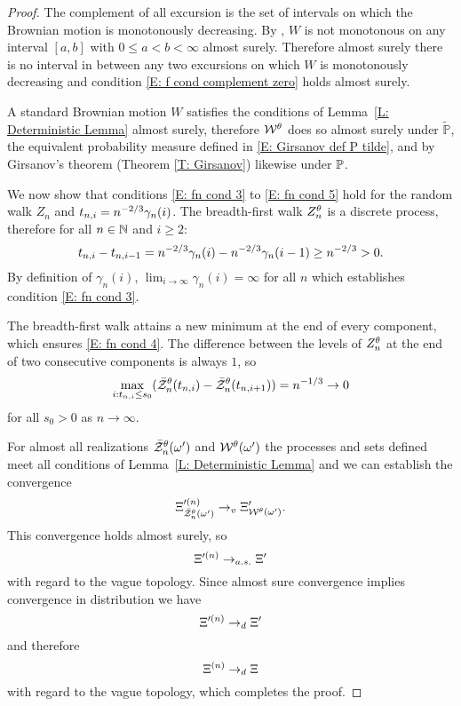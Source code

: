 \begin{proof}
	The complement of all excursion is the set of intervals
	on which the Brownian motion is monotonously decreasing.
	By \cite[Theorem 1.22, p.18]{Morters.2010}, 
	$W$ is not monotonous on any interval $[a,b]$ with $0 \leq a < b < \infty$ almost surely.
	Therefore almost surely there is no interval in between any two excursions on which $W$ is monotonously decreasing
	and condition \eqref{E: f cond complement zero} holds almost surely.
	
	A standard Brownian motion $W$ satisfies the conditions of Lemma~\ref{L: Deterministic Lemma} almost surely,
	therefore $\mathcal{W}^{\theta}$ does so almost surely under $\tilde{\mathbb{P}}$,
	the equivalent probability measure defined in \eqref{E: Girsanov def P tilde},
	and by Girsanov's theorem (Theorem \ref{T: Girsanov}) likewise under $\mathbb{P}$.

	
	We now show that conditions 
	\eqref{E: fn cond 3} to \eqref{E: fn cond 5}
	hold for the random walk $Z_n$ and $t_{n,i} = n^{-2 / 3} \gamma_n(i)$.
	The breadth-first walk $Z_n^{\theta}$ is a discrete process, therefore for all $n \in \mathbb{N}$ and $i \geq 2$:
	\begin{equation*}
		t_{n, i} - t_{n, i-1} = n^{-2 / 3}\gamma_n(i) - n^{-2 / 3}\gamma_n(i-1) \geq n^{-2 / 3} > 0.
	\end{equation*}
	By definition of $\gamma_n(i)$,
	$\lim_{i \rightarrow \infty} \gamma_n(i) = \infty$ for all $n$
	which establishes condition \eqref{E: fn cond 3}.
	
	The breadth-first walk attains a new minimum at the end of every component,
	which ensures \eqref{E: fn cond 4}.
	The difference between the levels of $Z_n^{\theta}$ at the end of two consecutive components is always $1$,
	so 
	\begin{equation*}
		\max_{i: t_{n, i} \leq s_0}(\bar{\mathcal{Z}}^{\theta}_n(t_{n, i}) - \bar{\mathcal{Z}}^{\theta}_n(t_{n, i+1})) = n^{-1 / 3} \rightarrow 0
	\end{equation*}
	for all $s_0 > 0$ as $n \rightarrow \infty$.
	
	
	For almost all realizations $\bar{\mathcal{Z}}^{\theta}_n(\omega')$ and $\mathcal{W}^{\theta}(\omega')$ 
	the processes and sets defined meet all conditions of Lemma~\ref{L: Deterministic Lemma}
	and we can establish the convergence
	\begin{equation*}	
		\Xi^{\prime (n)}_{\bar{\mathcal{Z}}^{\theta}_n(\omega')} \rightarrow_v \Xi^{\prime}_{\mathcal{W}^{\theta}(\omega')}.
	\end{equation*}
	This convergence holds almost surely, so
	\begin{equation*}
		\Xi^{\prime (n)} \rightarrow_{a.s.} \Xi^{\prime}
	\end{equation*}
	with regard to the vague topology.
	Since almost sure convergence implies convergence in distribution we have
	\begin{equation*}
		\Xi^{\prime (n)} \rightarrow_d \Xi^{\prime}
	\end{equation*}
	and therefore
	\begin{equation*}
		\Xi^{(n)} \rightarrow_d \Xi
	\end{equation*}
	with regard to the vague topology, which completes the proof.	
\end{proof}


